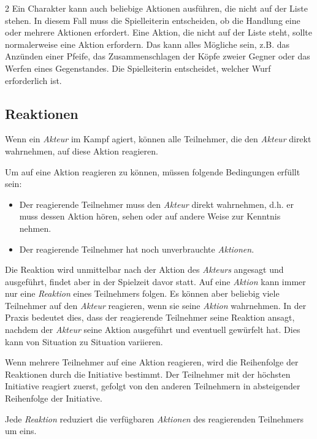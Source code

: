 \begin{multicols}{2}
Ein Charakter kann auch beliebige Aktionen ausführen, die nicht auf der Liste stehen. In diesem Fall muss die Spielleiterin entscheiden, ob die Handlung eine oder mehrere Aktionen erfordert. Eine Aktion, die nicht auf der Liste steht, sollte normalerweise eine Aktion erfordern. Das kann alles Mögliche sein, z.B. das Anzünden einer Pfeife, das Zusammenschlagen der Köpfe zweier Gegner oder das Werfen eines Gegenstandes. Die Spielleiterin entscheidet, welcher Wurf erforderlich ist.

\subsection{Reaktionen}

Wenn ein \textit{Akteur} im Kampf agiert, können alle Teilnehmer, die den \textit{Akteur} direkt wahrnehmen, auf diese Aktion reagieren.

Um auf eine Aktion reagieren zu können, müssen folgende Bedingungen erfüllt sein:
\begin{itemize}
    \item Der reagierende Teilnehmer muss den \textit{Akteur} direkt wahrnehmen, d.h. er muss dessen Aktion hören, sehen oder auf andere Weise zur Kenntnis nehmen.
    \item Der reagierende Teilnehmer hat noch unverbrauchte \textit{Aktionen}.
\end{itemize}

Die Reaktion wird unmittelbar nach der Aktion des \textit{Akteurs} angesagt und ausgeführt, findet aber in der Spielzeit davor statt. Auf eine \textit{Aktion} kann immer nur eine \textit{Reaktion} eines Teilnehmers folgen. Es können aber beliebig viele Teilnehmer auf den \textit{Akteur} reagieren, wenn sie seine \textit{Aktion} wahrnehmen. In der Praxis bedeutet dies, dass der reagierende Teilnehmer seine Reaktion ansagt, nachdem der \textit{Akteur} seine Aktion ausgeführt und eventuell gewürfelt hat. Dies kann von Situation zu Situation variieren.

Wenn mehrere Teilnehmer auf eine Aktion reagieren, wird die Reihenfolge der Reaktionen durch die Initiative bestimmt. Der Teilnehmer mit der höchsten Initiative reagiert zuerst, gefolgt von den anderen Teilnehmern in absteigender Reihenfolge der Initiative.

Jede \textit{Reaktion} reduziert die verfügbaren \textit{Aktionen} des reagierenden Teilnehmers um eins.


\end{multicols}
